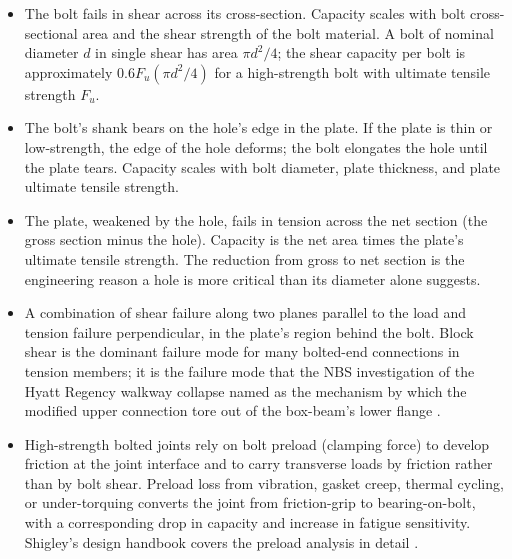 \begin{itemize}[leftmargin=*]
  \item {} The bolt fails in shear across its
    cross-section. Capacity scales with bolt cross-sectional area
    and the shear strength of the bolt material. A bolt of nominal
    diameter $d$ in single shear has area $\pi d^2 / 4$; the shear
    capacity per bolt is approximately $0.6 F_u (\pi d^2 / 4)$ for
    a high-strength bolt with ultimate tensile strength $F_u$.
  \item {} The bolt's shank bears on the hole's
    edge in the plate. If the plate is thin or low-strength, the
    edge of the hole deforms; the bolt elongates the hole until
    the plate tears. Capacity scales with bolt diameter, plate
    thickness, and plate ultimate tensile strength.
  \item {} The plate, weakened by the
    hole, fails in tension across the net section (the gross
    section minus the hole). Capacity is the net area times the
    plate's ultimate tensile strength. The reduction from gross to
    net section is the engineering reason a hole is more critical
    than its diameter alone suggests.
  \item {} A combination of shear failure
    along two planes parallel to the load and tension failure
    perpendicular, in the plate's region behind the bolt. Block
    shear is the dominant failure mode for many bolted-end
    connections in tension members; it is the failure mode that the
    NBS investigation of the Hyatt Regency walkway collapse named
    as the mechanism by which the modified upper connection tore
    out of the box-beam's lower flange \cite{acc:nbs-hyatt-1982}.
  \item {} High-strength
    bolted joints rely on bolt preload (clamping force) to develop
    friction at the joint interface and to carry transverse loads
    by friction rather than by bolt shear. Preload loss from
    vibration, gasket creep, thermal cycling, or under-torquing
    converts the joint from friction-grip to bearing-on-bolt, with
    a corresponding drop in capacity and increase in fatigue
    sensitivity. Shigley's design handbook covers the preload
    analysis in detail \cite[ch.~8]{text:shigley2020}.
\end{itemize}



